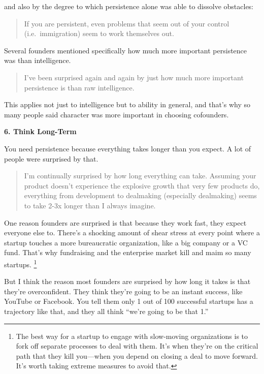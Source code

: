 and also by the degree to which persistence alone was able to dissolve
obstacles:

\begin{quote}
If you are persistent, even problems that seem out of your control
(i.e.~immigration) seem to work themselves out.
\end{quote}

Several founders mentioned specifically how much more important
persistence was than intelligence.

\begin{quote}
I've been surprised again and again by just how much more important
persistence is than raw intelligence.
\end{quote}

This applies not just to intelligence but to ability in general, and
that's why so many people said character was more important in choosing
cofounders.

\textbf{6. Think Long-Term}

You need persistence because everything takes longer than you expect. A
lot of people were surprised by that.

\begin{quote}
I'm continually surprised by how long everything can take. Assuming your
product doesn't experience the explosive growth that very few products
do, everything from development to dealmaking (especially dealmaking)
seems to take 2-3x longer than I always imagine.
\end{quote}

One reason founders are surprised is that because they work fast, they
expect everyone else to. There's a shocking amount of shear stress at
every point where a startup touches a more bureaucratic organization,
like a big company or a VC fund. That's why fundraising and the
enterprise market kill and maim so many startups.
\footnote{The best way for a startup to engage with slow-moving
organizations is to fork off separate processes to deal with them. It's
when they're on the critical path that they kill you---when you depend
on closing a deal to move forward. It's worth taking extreme measures to
avoid that.}

But I think the reason most founders are surprised by how long it takes
is that they're overconfident. They think they're going to be an instant
success, like YouTube or Facebook. You tell them only 1 out of 100
successful startups has a trajectory like that, and they all think
``we're going to be that 1.''

